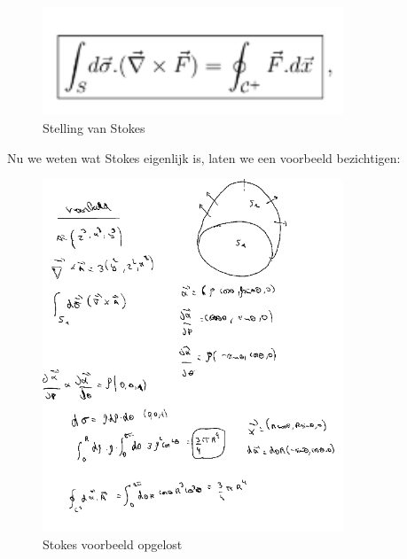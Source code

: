 \documentclass[a4paper]{report}
\begin{document}
\begin{figure}[H]
	\centering
	\includegraphics[width=0.8\textwidth]{assets/Stelling van Stokes.png}
	\caption{Stelling van Stokes}
	\label{fig:stelling-van-stokes}
\end{figure}

Nu we weten wat Stokes eigenlijk is, laten we een voorbeeld bezichtigen:


\begin{figure}[H]
	\centering
	\includegraphics[width=0.8\textwidth]{assets/stokes_voorbeeld_opgelost.png}
	\caption{Stokes voorbeeld opgelost}
	\label{fig:stokes_voorbeeld_opgelost}
\end{figure}
\end{document}
